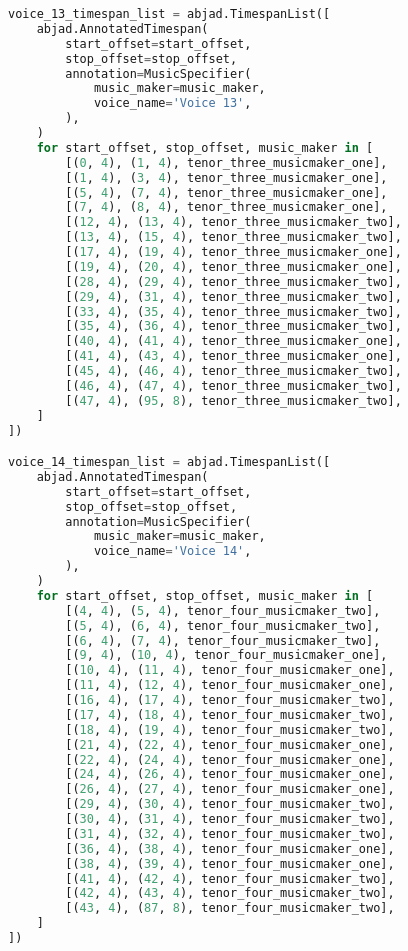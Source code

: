\begin{lstlisting}[language=Python, caption=Invocation Source Code]
voice_13_timespan_list = abjad.TimespanList([
    abjad.AnnotatedTimespan(
        start_offset=start_offset,
        stop_offset=stop_offset,
        annotation=MusicSpecifier(
            music_maker=music_maker,
            voice_name='Voice 13',
        ),
    )
    for start_offset, stop_offset, music_maker in [
        [(0, 4), (1, 4), tenor_three_musicmaker_one],
        [(1, 4), (3, 4), tenor_three_musicmaker_one],
        [(5, 4), (7, 4), tenor_three_musicmaker_one],
        [(7, 4), (8, 4), tenor_three_musicmaker_one],
        [(12, 4), (13, 4), tenor_three_musicmaker_two],
        [(13, 4), (15, 4), tenor_three_musicmaker_two],
        [(17, 4), (19, 4), tenor_three_musicmaker_one],
        [(19, 4), (20, 4), tenor_three_musicmaker_one],
        [(28, 4), (29, 4), tenor_three_musicmaker_two],
        [(29, 4), (31, 4), tenor_three_musicmaker_two],
        [(33, 4), (35, 4), tenor_three_musicmaker_two],
        [(35, 4), (36, 4), tenor_three_musicmaker_two],
        [(40, 4), (41, 4), tenor_three_musicmaker_one],
        [(41, 4), (43, 4), tenor_three_musicmaker_one],
        [(45, 4), (46, 4), tenor_three_musicmaker_two],
        [(46, 4), (47, 4), tenor_three_musicmaker_two],
        [(47, 4), (95, 8), tenor_three_musicmaker_two],
    ]
])

voice_14_timespan_list = abjad.TimespanList([
    abjad.AnnotatedTimespan(
        start_offset=start_offset,
        stop_offset=stop_offset,
        annotation=MusicSpecifier(
            music_maker=music_maker,
            voice_name='Voice 14',
        ),
    )
    for start_offset, stop_offset, music_maker in [
        [(4, 4), (5, 4), tenor_four_musicmaker_two],
        [(5, 4), (6, 4), tenor_four_musicmaker_two],
        [(6, 4), (7, 4), tenor_four_musicmaker_two],
        [(9, 4), (10, 4), tenor_four_musicmaker_one],
        [(10, 4), (11, 4), tenor_four_musicmaker_one],
        [(11, 4), (12, 4), tenor_four_musicmaker_one],
        [(16, 4), (17, 4), tenor_four_musicmaker_two],
        [(17, 4), (18, 4), tenor_four_musicmaker_two],
        [(18, 4), (19, 4), tenor_four_musicmaker_two],
        [(21, 4), (22, 4), tenor_four_musicmaker_one],
        [(22, 4), (24, 4), tenor_four_musicmaker_one],
        [(24, 4), (26, 4), tenor_four_musicmaker_one],
        [(26, 4), (27, 4), tenor_four_musicmaker_one],
        [(29, 4), (30, 4), tenor_four_musicmaker_two],
        [(30, 4), (31, 4), tenor_four_musicmaker_two],
        [(31, 4), (32, 4), tenor_four_musicmaker_two],
        [(36, 4), (38, 4), tenor_four_musicmaker_one],
        [(38, 4), (39, 4), tenor_four_musicmaker_one],
        [(41, 4), (42, 4), tenor_four_musicmaker_two],
        [(42, 4), (43, 4), tenor_four_musicmaker_two],
        [(43, 4), (87, 8), tenor_four_musicmaker_two],
    ]
])


\end{lstlisting}
